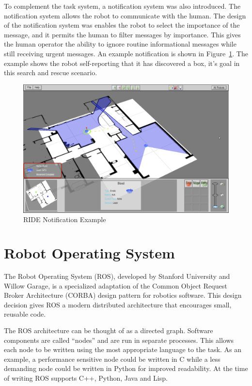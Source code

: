 To complement the task system, a notification system was also introduced. The notification system allows the robot to communicate with the human. The design of the notification system was enables the robot to select the importance of the message, and it permits the human to filter messages by importance. This gives the human operator the ability to ignore routine informational messages while still receiving urgent messages. An example notification is shown in Figure~\ref{fig:ride-notification}. The example shows the robot self-reporting that it has discovered a box, it's goal in this search and rescue scenario.

\begin{figure}[ht]
\begin{center}
\includegraphics[width=6.10in]{images/ride-notification.png}
\caption{RIDE Notification Example\label{fig:ride-notification}}
\end{center}
\end{figure}


\section{Robot Operating System}
The Robot Operating System (ROS), developed by Stanford University and Willow Garage, is a specialized adaptation of the Common Object Request Broker Architecture (CORBA) design pattern for robotics software. This design decision gives ROS a modern distributed architecture that encourages small, reusable code.

The ROS architecture can be thought of as a directed graph. Software components are called ``nodes'' and are run in separate processes. This allows each node to be written using the most appropriate language to the task. As an example, a performance sensitive node could be written in C while a less demanding node could be written in Python for improved readability. At the time of writing ROS supports C++, Python, Java and Lisp.

